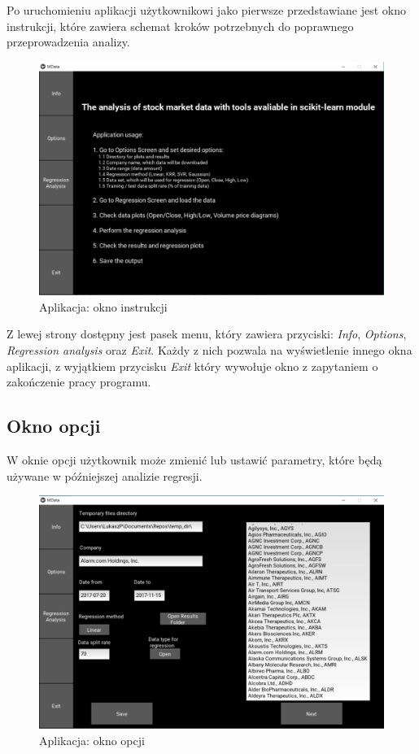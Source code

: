 Po uruchomieniu aplikacji użytkownikowi jako pierwsze przedstawiane jest okno instrukcji, które zawiera schemat kroków potrzebnych do poprawnego przeprowadzenia analizy.
\begin{figure}[h!]
\centering
\includegraphics[width=150mm]{pictures/app_info_screen.png}
\caption{Aplikacja: okno instrukcji}
\label{fig:Okno instrukcji}
\end{figure}

Z lewej strony dostępny jest pasek menu, który zawiera przyciski: \textit{Info}, \textit{Options}, \textit{Regression analysis} oraz \textit{Exit}.
Każdy z nich pozwala na wyświetlenie innego okna aplikacji, z wyjątkiem przycisku \textit{Exit} który wywołuje okno z zapytaniem o zakończenie pracy programu.

\subsection{Okno opcji}
W oknie opcji użytkownik może zmienić lub ustawić parametry, które będą używane w późniejszej analizie regresji.
\begin{figure}[h!]
\centering
\includegraphics[width=150mm]{pictures/app_options_screen.png}
\caption{Aplikacja: okno opcji}
\label{fig:Okno opcji}
\end{figure}

